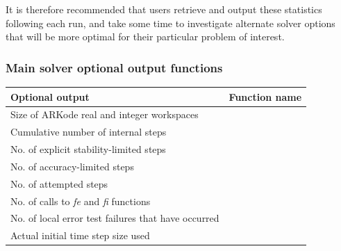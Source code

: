 \documentclass[letterpaper,10pt,english]{sphinxmanual}
\begin{document}
It is therefore recommended that users retrieve and output these
statistics following each run, and take some time to investigate
alternate solver options that will be more optimal for their
particular problem of interest.


\subsubsection{Main solver optional output functions}
\label{c_interface/User_callable:main-solver-optional-output-functions}\label{c_interface/User_callable:cinterface-arkodemainoutputs}
\begin{tabulary}{\linewidth}{|L|L|}
\hline
\textbf{
Optional output
} & \textbf{
Function name
}\\\hline

Size of ARKode real and integer workspaces
 & 
{\hyperref[c_interface/User_callable:ARKodeGetWorkSpace]{}}
\\\hline

Cumulative number of internal steps
 & 
{\hyperref[c_interface/User_callable:ARKodeGetNumSteps]{}}
\\\hline

No. of explicit stability-limited steps
 & 
{\hyperref[c_interface/User_callable:ARKodeGetNumExpSteps]{}}
\\\hline

No. of accuracy-limited steps
 & 
{\hyperref[c_interface/User_callable:ARKodeGetNumAccSteps]{}}
\\\hline

No. of attempted steps
 & 
{\hyperref[c_interface/User_callable:ARKodeGetNumStepAttempts]{}}
\\\hline

No. of calls to \emph{fe} and \emph{fi} functions
 & 
{\hyperref[c_interface/User_callable:ARKodeGetNumRhsEvals]{}}
\\\hline

No. of local error test failures that have occurred
 & 
{\hyperref[c_interface/User_callable:ARKodeGetNumErrTestFails]{}}
\\\hline

Actual initial time step size used
 & 
{\hyperref[c_interface/User_callable:ARKodeGetActualInitStep]{}}
\\\hline


\end{tabulary}
\end{document}
